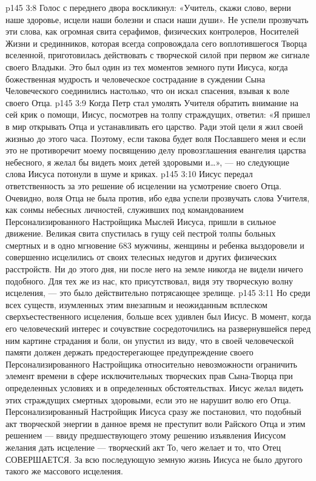 \vs p145 3:8 Голос с переднего двора воскликнул: «Учитель, скажи слово, верни наше здоровье, исцели наши болезни и спаси наши души». Не успели прозвучать эти слова, как огромная свита серафимов, физических контролеров, Носителей Жизни и срединников, которая всегда сопровождала сего воплотившегося Творца вселенной, приготовилась действовать с творческой силой при первом же сигнале своего Владыки. Это был один из тех моментов земного пути Иисуса, когда божественная мудрость и человеческое сострадание в суждении Сына Человеческого соединились настолько, что он искал спасения, взывая к воле своего Отца.
\vs p145 3:9 Когда Петр стал умолять Учителя обратить внимание на сей крик о помощи, Иисус, посмотрев на толпу страждущих, ответил: «Я пришел в мир открывать Отца и устанавливать его царство. Ради этой цели я жил своей жизнью до этого часа. Поэтому, если такова будет воля Пославшего меня и если это не противоречит моему посвящению делу провозглашения евангелия царства небесного, я желал бы видеть моих детей здоровыми и\ldots », --- но следующие слова Иисуса потонули в шуме и криках.
\vs p145 3:10 Иисус передал ответственность за это решение об исцелении на усмотрение своего Отца. Очевидно, воля Отца не была против, ибо едва успели прозвучать слова Учителя, как сонмы небесных личностей, служивших под командованием Персонализированного Настройщика Мыслей Иисуса, пришли в сильное движение. Великая свита спустилась в гущу сей пестрой толпы больных смертных и в одно мгновение 683 мужчины, женщины и ребенка выздоровели и совершенно исцелились от своих телесных недугов и других физических расстройств. Ни до этого дня, ни после него на земле никогда не видели ничего подобного. Для тех же из нас, кто присутствовал, видя эту творческую волну исцеления, --- это было действительно потрясающее зрелище.
\vs p145 3:11 \pc Но среди всех существ, изумленных этим внезапным и неожиданным всплеском сверхъестественного исцеления, больше всех удивлен был Иисус. В момент, когда его человеческий интерес и сочувствие сосредоточились на развернувшейся перед ним картине страдания и боли, он упустил из виду, что в своей человеческой памяти должен держать предостерегающее предупреждение своего Персонализированного Настройщика относительно невозможности ограничить элемент времени в сфере исключительных творческих прав Сына\hyp{}Творца при определенных условиях и в определенных обстоятельствах. Иисус желал видеть этих страждущих смертных здоровыми, если это не нарушит волю его Отца. Персонализированный Настройщик Иисуса сразу же постановил, что подобный акт творческой энергии в данное время не преступит воли Райского Отца и этим решением --- ввиду предшествующего этому решению изъявления Иисусом желания дать исцеление --- творческий акт  То, чего желает  и то, что Отец  СОВЕРШАЕТСЯ. За всю последующую земную жизнь Иисуса не было другого такого же массового исцеления.
